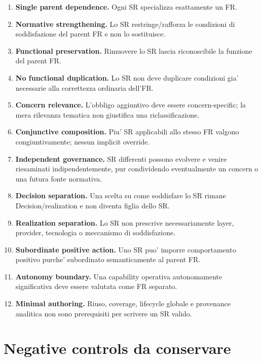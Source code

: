\documentclass[11pt,a4paper]{article}
\begin{document}
\begin{enumerate}[label=\textbf{S1-CLOSED-\arabic*.}]
  \item \textbf{Single parent dependence.} Ogni SR specializza esattamente un FR.
  \item \textbf{Normative strengthening.} Lo SR restringe/rafforza le condizioni di soddisfazione del parent FR e non lo sostituisce.
  \item \textbf{Functional preservation.} Rimuovere lo SR lascia riconoscibile la funzione del parent FR.
  \item \textbf{No functional duplication.} Lo SR non deve duplicare condizioni gia' necessarie alla correttezza ordinaria dell'FR.
  \item \textbf{Concern relevance.} L'obbligo aggiuntivo deve essere concern-specific; la mera rilevanza tematica non giustifica una riclassificazione.
  \item \textbf{Conjunctive composition.} Piu' SR applicabili allo stesso FR valgono congiuntivamente; nessun implicit override.
  \item \textbf{Independent governance.} SR differenti possono evolvere e venire riesaminati indipendentemente, pur condividendo eventualmente un concern o una futura fonte normativa.
  \item \textbf{Decision separation.} Una scelta su come soddisfare lo SR rimane Decision/realization e non diventa figlia dello SR.
  \item \textbf{Realization separation.} Lo SR non prescrive necessariamente layer, provider, tecnologia o meccanismo di soddisfazione.
  \item \textbf{Subordinate positive action.} Uno SR puo' imporre comportamento positivo purche' subordinato semanticamente al parent FR.
  \item \textbf{Autonomy boundary.} Una capability operativa autonomamente significativa deve essere valutata come FR separato.
  \item \textbf{Minimal authoring.} Riuso, coverage, lifecycle globale e provenance analitica non sono prerequisiti per scrivere un SR valido.
\end{enumerate}

\section{Negative controls da conservare}
\end{document}
